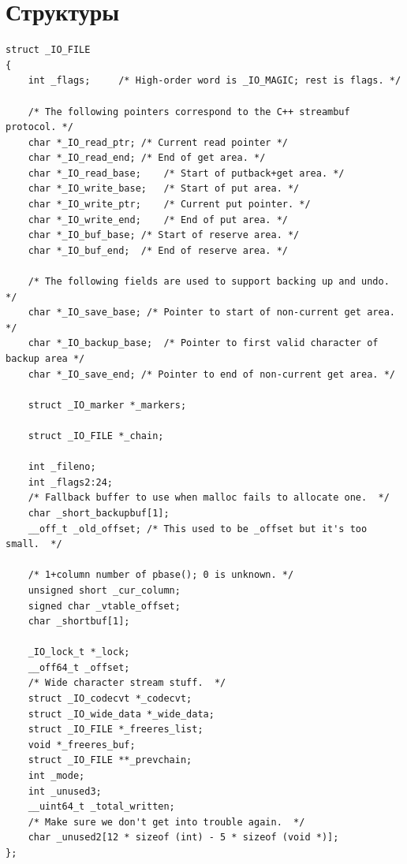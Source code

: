 \section{Структуры}

\begin{lstlisting}[caption={Структура \_IO\_FILE}, label={lst:IO_FILE}]
struct _IO_FILE
{
	int _flags;		/* High-order word is _IO_MAGIC; rest is flags. */

	/* The following pointers correspond to the C++ streambuf protocol. */
	char *_IO_read_ptr;	/* Current read pointer */
	char *_IO_read_end;	/* End of get area. */
	char *_IO_read_base;	/* Start of putback+get area. */
	char *_IO_write_base;	/* Start of put area. */
	char *_IO_write_ptr;	/* Current put pointer. */
	char *_IO_write_end;	/* End of put area. */
	char *_IO_buf_base;	/* Start of reserve area. */
	char *_IO_buf_end;	/* End of reserve area. */

	/* The following fields are used to support backing up and undo. */
	char *_IO_save_base; /* Pointer to start of non-current get area. */
	char *_IO_backup_base;  /* Pointer to first valid character of backup area */
	char *_IO_save_end; /* Pointer to end of non-current get area. */

	struct _IO_marker *_markers;

	struct _IO_FILE *_chain;

	int _fileno;
	int _flags2:24;
	/* Fallback buffer to use when malloc fails to allocate one.  */
	char _short_backupbuf[1];
	__off_t _old_offset; /* This used to be _offset but it's too small.  */

	/* 1+column number of pbase(); 0 is unknown. */
	unsigned short _cur_column;
	signed char _vtable_offset;
	char _shortbuf[1];

	_IO_lock_t *_lock;
	__off64_t _offset;
	/* Wide character stream stuff.  */
	struct _IO_codecvt *_codecvt;
	struct _IO_wide_data *_wide_data;
	struct _IO_FILE *_freeres_list;
	void *_freeres_buf;
	struct _IO_FILE **_prevchain;
	int _mode;
	int _unused3;
	__uint64_t _total_written;
	/* Make sure we don't get into trouble again.  */
	char _unused2[12 * sizeof (int) - 5 * sizeof (void *)];
};
\end{lstlisting}

